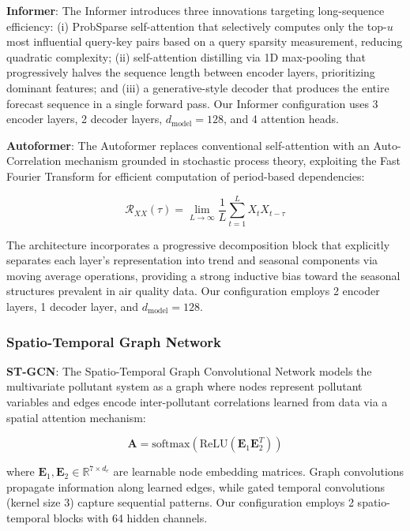 \documentclass[conference]{IEEEtran}
\begin{document}
\textbf{Informer}: The Informer \cite{zhou2021} introduces three innovations targeting long-sequence efficiency: (i) ProbSparse self-attention that selectively computes only the top-$u$ most influential query-key pairs based on a query sparsity measurement, reducing quadratic complexity; (ii) self-attention distilling via 1D max-pooling that progressively halves the sequence length between encoder layers, prioritizing dominant features; and (iii) a generative-style decoder that produces the entire forecast sequence in a single forward pass. Our Informer configuration uses 3 encoder layers, 2 decoder layers, $d_{\text{model}} = 128$, and 4 attention heads.

\textbf{Autoformer}: The Autoformer \cite{wu2021} replaces conventional self-attention with an Auto-Correlation mechanism grounded in stochastic process theory, exploiting the Fast Fourier Transform for efficient computation of period-based dependencies:

\begin{equation}
\mathcal{R}_{XX}(\tau) = \lim_{L \to \infty} \frac{1}{L} \sum_{t=1}^{L} X_t X_{t - \tau}
\label{eq:autocorr}
\end{equation}

The architecture incorporates a progressive decomposition block that explicitly separates each layer's representation into trend and seasonal components via moving average operations, providing a strong inductive bias toward the seasonal structures prevalent in air quality data. Our configuration employs 2 encoder layers, 1 decoder layer, and $d_{\text{model}} = 128$.

\subsubsection{Spatio-Temporal Graph Network}

\textbf{ST-GCN}: The Spatio-Temporal Graph Convolutional Network \cite{yan2018} models the multivariate pollutant system as a graph where nodes represent pollutant variables and edges encode inter-pollutant correlations learned from data via a spatial attention mechanism:

\begin{equation}
\mathbf{A} = \text{softmax}(\text{ReLU}(\mathbf{E}_1 \mathbf{E}_2^{T}))
\label{eq:adj}
\end{equation}

where $\mathbf{E}_1, \mathbf{E}_2 \in \mathbb{R}^{7 \times d_e}$ are learnable node embedding matrices. Graph convolutions propagate information along learned edges, while gated temporal convolutions (kernel size 3) capture sequential patterns. Our configuration employs 2 spatio-temporal blocks with 64 hidden channels.
\end{document}

